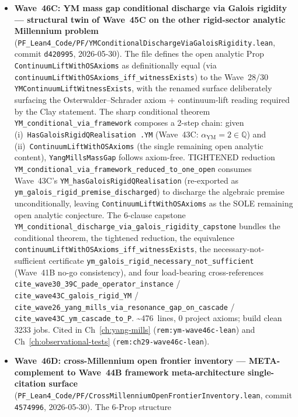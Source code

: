 \begin{itemize}
\item \textbf{Wave~46C: YM mass gap conditional discharge via
  Galois rigidity --- structural twin of Wave~45C on the other
  rigid-sector analytic Millennium problem}
  (\texttt{PF\_Lean4\_Code/PF/YMConditionalDischargeViaGaloisRigidity.lean},
  commit \texttt{d420995}, 2026-05-30). The file defines the open
  analytic Prop \texttt{ContinuumLiftWithOSAxioms} as definitionally
  equal (via \texttt{continuumLiftWithOSAxioms\_iff\_witnessExists})
  to the Wave~28/30 \texttt{YMContinuumLiftWitnessExists}, with the
  renamed surface deliberately surfacing the Osterwalder--Schrader
  axiom + continuum-lift reading required by the Clay statement.
  The sharp conditional theorem \texttt{YM\_conditional\_via\_framework}
  composes a 2-step chain: given (i)~\texttt{HasGaloisRigidQRealisation
  .YM} (Wave~43C: $\alpha_{\mathrm{YM}} = 2 \in \mathbb{Q}$) and
  (ii)~\texttt{ContinuumLiftWithOSAxioms} (the single remaining open
  analytic content), \texttt{YangMillsMassGap} follows axiom-free.
  TIGHTENED reduction
  \texttt{YM\_conditional\_via\_framework\_reduced\_to\_one\_open}
  consumes Wave~43C's \texttt{YM\_hasGaloisRigidQRealisation}
  (re-exported as \texttt{ym\_galois\_rigid\_premise\_discharged})
  to discharge the algebraic premise unconditionally, leaving
  \texttt{ContinuumLiftWithOSAxioms} as the SOLE remaining open
  analytic conjecture. The 6-clause capstone
  \texttt{YM\_conditional\_discharge\_via\_galois\_rigidity\_capstone}
  bundles the conditional theorem, the tightened reduction, the
  equivalence \texttt{continuumLiftWithOSAxioms\_iff\_witnessExists},
  the necessary-not-sufficient certificate
  \texttt{ym\_galois\_rigid\_necessary\_not\_sufficient} (Wave~41B
  no-go consistency), and four load-bearing cross-references
  \texttt{cite\_wave30\_39C\_pade\_operator\_instance} /
  \texttt{cite\_wave43C\_galois\_rigid\_YM} /
  \texttt{cite\_wave26\_yang\_mills\_via\_resonance\_gap\_on\_cascade}
  / \texttt{cite\_wave43C\_ym\_cascade\_to\_P}.
  \textasciitilde 476~lines, 0 project axioms; build clean 3233 jobs.
  Cited in Ch~\ref{ch:yang-mills} (\texttt{rem:ym-wave46c-lean}) and
  Ch~\ref{ch:observational-tests} (\texttt{rem:ch29-wave46c-lean}).
\item \textbf{Wave~46D: cross-Millennium open frontier inventory ---
  META-complement to Wave~44B framework meta-architecture
  single-citation surface}
  (\texttt{PF\_Lean4\_Code/PF/CrossMillenniumOpenFrontierInventory.lean},
  commit \texttt{4574996}, 2026-05-30). The 6-Prop structure

\end{itemize}
